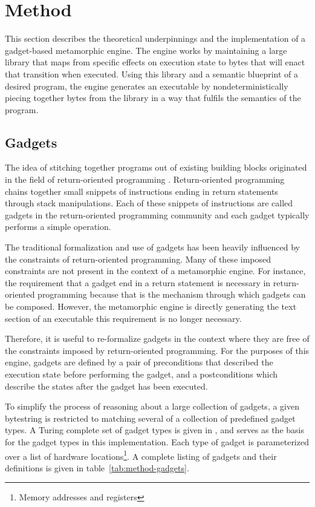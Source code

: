 \chapter{Method}

    This section describes the theoretical underpinnings and the implementation
    of a gadget-based metamorphic engine. The engine works by maintaining a
    large library that maps from specific effects on execution state to bytes
    that will enact that transition when executed. Using this library and a
    semantic blueprint of a desired program, the engine generates an executable
    by nondeterministically piecing together bytes from the library in a way
    that fulfils the semantics of the program.

    \section{Gadgets}
    
    The idea of stitching together programs out of existing building blocks
    originated in the field of return-oriented programming \cite{rop_geo}.
    Return-oriented programming chains together small snippets of instructions
    ending in return statements through stack manipulations. Each of these
    snippets of instructions are called gadgets in the return-oriented
    programming community and each gadget typically performs a simple operation.

    The traditional formalization and use of gadgets has been heavily influenced
    by the constraints of return-oriented programming. Many of these imposed
    constraints are not present in the context of a metamorphic engine. For
    instance, the requirement that a gadget end in a return statement is
    necessary in return-oriented programming because that is the mechanism
    through which gadgets can be composed. However, the metamorphic engine is
    directly generating the text section of an executable this requirement is no
    longer necessary.

    Therefore, it is useful to re-formalize gadgets in the context where they
    are free of the constraints imposed by return-oriented programming. For the
    purposes of this engine, gadgets are defined by a pair of preconditions that
    described the execution state before performing the gadget, and a
    postconditions which describe the states after the gadget has been executed.

    To simplify the process of reasoning about a large collection of gadgets, a
    given bytestring is restricted to matching several of a collection of
    predefined gadget types. A Turing complete set of gadget types is given in
    \cite{franken}, and serves as the basis for the gadget types in this
    implementation. Each type of gadget is parameterized over a list of hardware
    locations\footnote{Memory addresses and registers}. A complete listing of
    gadgets and their definitions is given in table~\ref{tab:method-gadgets}.

